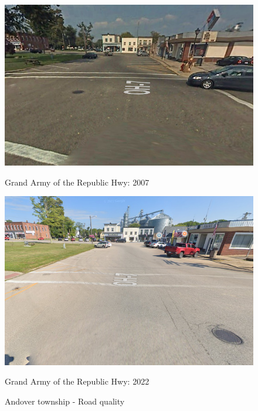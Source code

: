 \begin{figure}[htbp]
    \centering
    \begin{minipage}{0.49\textwidth}
        \centering
        \includegraphics[width=\textwidth,keepaspectratio]{images/andover_township_14grandarmy_2007.png}
        \caption*{Grand Army of the Republic Hwy: 2007} %
        \label{fig:andover_2007}
    \end{minipage}
    \hfill
    \begin{minipage}{0.49\textwidth}
        \centering
        \includegraphics[width=\textwidth,keepaspectratio]{images/andover_township_14grandarmy_2022.png}
        \caption*{Grand Army of the Republic Hwy: 2022}
        \label{fig:andover_2022}
    \end{minipage}
    \caption{Andover township - Road quality}
    \label{fig:rd_andover}
\end{figure}


